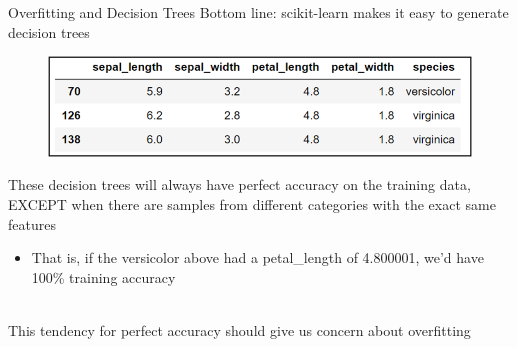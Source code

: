 \documentclass[aspectratio=169]{../latex_main/tntbeamer}  %
\begin{document}
	
	
	\begin{frame}{Overfitting and Decision Trees}
	    Bottom line: scikit-learn makes it easy to generate decision trees
	    \begin{figure}
	        \includegraphics[scale=.5]{Bild29}
	    \end{figure}
	    These decision trees will always have perfect accuracy on the training data, EXCEPT when there are samples from different categories with the exact same features
	    \begin{itemize}
	        \item That is, if the versicolor above had a petal\_length of 4.800001, we’d have 100\% training accuracy
	    \end{itemize}
	    \\
	    \bigskip
	    This tendency for perfect accuracy should give us concern about overfitting
	\end{frame}
\end{document}

